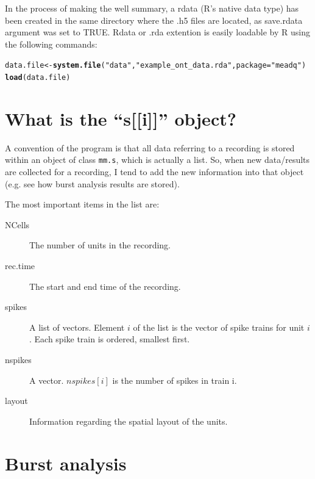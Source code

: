 \documentclass{article}\usepackage[]{graphicx}\usepackage[]{color}
\makeatletter
\newcommand{\hlstr}[1]{\textcolor[rgb]{0.192,0.494,0.8}{#1}}%
\newcommand{\hlstd}[1]{\textcolor[rgb]{0.345,0.345,0.345}{#1}}%
\newcommand{\hlkwb}[1]{\textcolor[rgb]{0.69,0.353,0.396}{#1}}%
\newcommand{\hlkwc}[1]{\textcolor[rgb]{0.333,0.667,0.333}{#1}}%
\newcommand{\hlkwd}[1]{\textcolor[rgb]{0.737,0.353,0.396}{\textbf{#1}}}%
\newenvironment{kframe}{%
 \def\at@end@of@kframe{}%
 \ifinner\ifhmode%
  \def\at@end@of@kframe{\end{minipage}}%
  \begin{minipage}{\columnwidth}%
 \fi\fi%
 \def\FrameCommand##1{\hskip\@totalleftmargin \hskip-\fboxsep
 \colorbox{shadecolor}{##1}\hskip-\fboxsep
     \hskip-\linewidth \hskip-\@totalleftmargin \hskip\columnwidth}%
 \MakeFramed {\advance\hsize-\width
   \@totalleftmargin\z@ \linewidth\hsize
   \@setminipage}}%
 {\par\unskip\endMakeFramed%
 \at@end@of@kframe}
\newenvironment{knitrout}{}{} %
\makeatother
\begin{document}
In the process of making the well summary, a rdata (R's native data type) has been created in the same directory where the .h5 files are located, as save.rdata argument was set to TRUE.  Rdata or .rda extention is easily loadable by R using the following commands:
\begin{knitrout}
\color{fgcolor}\begin{kframe}
\begin{alltt}
\hlstd{data.file} \hlkwb{<-} \hlkwd{system.file}\hlstd{(}\hlstr{"data"}\hlstd{,} \hlstr{"example_ont_data.rda"}\hlstd{,} \hlkwc{package} \hlstd{=} \hlstr{"meadq"}\hlstd{)}
\hlkwd{load}\hlstd{(data.file)}
\end{alltt}
\end{kframe}
\end{knitrout}






\section*{What is the ``s[[i]]'' object?}

A convention of the program is that all data referring to a recording
is stored within an object of class \texttt{mm.s}, which is actually a
list.  So, when new data/results are collected for a recording, I tend
to add the new information into that object (e.g. see how burst
analysis results are stored).

The most important items in the list are:
\begin{description}
\item[NCells] The number of units in the recording.
\item[rec.time] The start and end time of the recording.
\item[spikes] A list of vectors.  Element $i$ of the list is the
  vector of spike trains for unit $i$.  Each spike train is ordered, smallest first.
\item[nspikes] A vector.  $nspikes[i]$ is the number of spikes in
  train i.
\item[layout] Information regarding the spatial layout of the units.
\end{description}











\section*{Burst analysis}
\end{document}
